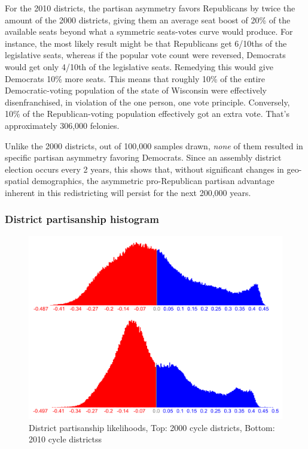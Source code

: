 \documentclass[preprint,12pt]{article}
\begin{document}
For the 2010 districts, the partisan asymmetry favors Republicans by twice the amount of the 2000 districts, giving them an average seat boost of 20\% of the available seats beyond what a symmetric seats-votes curve would produce.  
For instance, the most likely result might be that Republicans get 6/10ths of the legislative seats, whereas if the popular vote count were reversed, Democrats would get only 4/10th of the legislative seats.  
Remedying this would give Democrats 10\% more seats.  
This means that roughly 10\% of the entire Democratic-voting population of the state of Wisconsin were effectively disenfranchised, in violation of the one person, one vote principle.  
Conversely, 10\% of the Republican-voting population effectively got an extra vote.  That's approximately 306,000 felonies.

Unlike the 2000 districts, out of 100,000 samples drawn, \emph{none} of them resulted in specific partisan asymmetry favoring Democrats.  
Since an assembly district election occurs every 2 years, this shows that, without significant changes in geo-spatial demographics, the asymmetric pro-Republican partisan advantage inherent in this redistricting will persist for the next 200,000 years.

\subsubsection{District partisanship histogram}
  
\begin{figure}[htb!]
    \begin{center}
        \includegraphics[scale=0.25]{../Figures/WI_compared/district_partisanship_cropped.png}
        \caption{District partisanship likelihoods, Top: 2000 cycle districts, Bottom: 2010 cycle districtss}\label{fig:LikelihoodsDistrictPartisanship}
    \end{center}
\end{figure}
\end{document}
